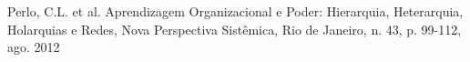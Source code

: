 \documentclass[
12pt,		%
openright,	%
twoside,  %
a4paper,			%
chapter=TITLE,		%
english,			%
french,				%
spanish,			%
brazil				%
]{USPSC-classe/USPSC}
\begin{document}
\begin{flushleft}
\begin{flushleft}
\begin{flushleft}
\begin{flushleft}
\begin{flushleft}
\begin{flushleft}
\begin{flushleft}
\begin{flushleft}
\begin{flushleft}
\begin{flushleft}
[PERLO et al., 2012] Perlo, C.L. et al. Aprendizagem Organizacional e Poder: Hierarquia, Heterarquia, Holarquias e Redes, Nova Perspectiva Sist\^emica, Rio de Janeiro, n. 43, p. 99-112, ago. 2012
\end{flushleft}


\end{flushleft}


\end{flushleft}


\end{flushleft}


\end{flushleft}


\end{flushleft}


\end{flushleft}


\end{flushleft}


\end{flushleft}


\end{flushleft}
\end{document}
